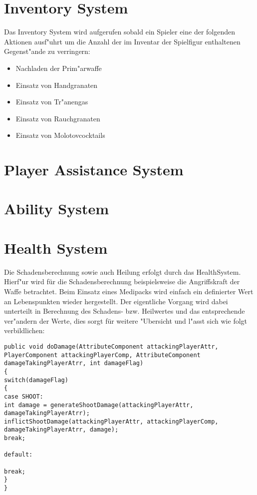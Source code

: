 \section{Inventory System}

Das Inventory System wird aufgerufen sobald ein Spieler eine der folgenden Aktionen ausf"uhrt um die Anzahl der im Inventar der Spielfigur enthaltenen Gegenst"ande zu verringern:\newline


\begin{itemize}
	\item Nachladen der Prim"arwaffe
	\item Einsatz von Handgranaten
	\item Einsatz von Tr"anengas
	\item Einsatz von Rauchgranaten
	\item Einsatz von Molotovcocktails
\end{itemize}





\section{Player Assistance System}



\section{Ability System}



\section{Health System}

Die Schadensberechnung sowie auch Heilung erfolgt durch das HealthSystem. Hierf"ur wird für die Schadensberechnung beispielsweise die Angriffskraft der Waffe betrachtet. Beim Einsatz eines Medipacks wird einfach ein definierter Wert an Lebenspunkten wieder hergestellt.
Der eigentliche Vorgang wird dabei unterteilt in Berechnung des Schadens- bzw. Heilwertes und das entsprechende ver"andern der Werte, dies sorgt für weitere "Ubersicht und l"asst sich wie folgt verbildlichen:

\begin{lstlisting}[breaklines = true]
public void doDamage(AttributeComponent attackingPlayerAttr, PlayerComponent attackingPlayerComp, AttributeComponent damageTakingPlayerAtrr, int damageFlag)
{
switch(damageFlag)
{
case SHOOT:
int damage = generateShootDamage(attackingPlayerAttr, damageTakingPlayerAtrr);
inflictShootDamage(attackingPlayerAttr, attackingPlayerComp, damageTakingPlayerAtrr, damage);                    
break;

default:

break;
}
}
\end{lstlisting}

